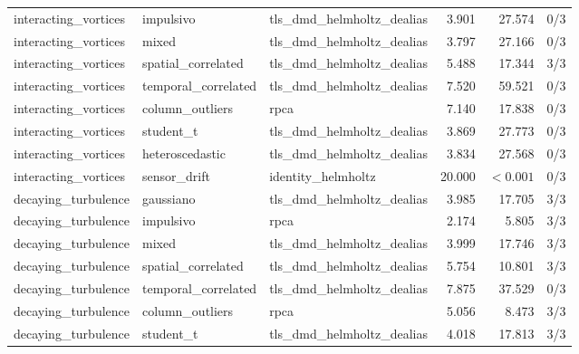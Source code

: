 {\begin{longtable}{p{}p{}p{}rrr}
interacting\_\allowbreak vortices & impulsivo & tls\_\allowbreak dmd\_\allowbreak helmholtz\_\allowbreak dealias & 3.901 & 27.574 & 0/3 \\
interacting\_\allowbreak vortices & mixed & tls\_\allowbreak dmd\_\allowbreak helmholtz\_\allowbreak dealias & 3.797 & 27.166 & 0/3 \\
interacting\_\allowbreak vortices & spatial\_\allowbreak correlated & tls\_\allowbreak dmd\_\allowbreak helmholtz\_\allowbreak dealias & 5.488 & 17.344 & 3/3 \\
interacting\_\allowbreak vortices & temporal\_\allowbreak correlated & tls\_\allowbreak dmd\_\allowbreak helmholtz\_\allowbreak dealias & 7.520 & 59.521 & 0/3 \\
interacting\_\allowbreak vortices & column\_\allowbreak outliers & rpca & 7.140 & 17.838 & 0/3 \\
interacting\_\allowbreak vortices & student\_\allowbreak t & tls\_\allowbreak dmd\_\allowbreak helmholtz\_\allowbreak dealias & 3.869 & 27.773 & 0/3 \\
interacting\_\allowbreak vortices & heteroscedastic & tls\_\allowbreak dmd\_\allowbreak helmholtz\_\allowbreak dealias & 3.834 & 27.568 & 0/3 \\
interacting\_\allowbreak vortices & sensor\_\allowbreak drift & identity\_\allowbreak helmholtz & 20.000 & $<0.001$ & 0/3 \\
decaying\_\allowbreak turbulence & gaussiano & tls\_\allowbreak dmd\_\allowbreak helmholtz\_\allowbreak dealias & 3.985 & 17.705 & 3/3 \\
decaying\_\allowbreak turbulence & impulsivo & rpca & 2.174 & 5.805 & 3/3 \\
decaying\_\allowbreak turbulence & mixed & tls\_\allowbreak dmd\_\allowbreak helmholtz\_\allowbreak dealias & 3.999 & 17.746 & 3/3 \\
decaying\_\allowbreak turbulence & spatial\_\allowbreak correlated & tls\_\allowbreak dmd\_\allowbreak helmholtz\_\allowbreak dealias & 5.754 & 10.801 & 3/3 \\
decaying\_\allowbreak turbulence & temporal\_\allowbreak correlated & tls\_\allowbreak dmd\_\allowbreak helmholtz\_\allowbreak dealias & 7.875 & 37.529 & 0/3 \\
decaying\_\allowbreak turbulence & column\_\allowbreak outliers & rpca & 5.056 & 8.473 & 3/3 \\
decaying\_\allowbreak turbulence & student\_\allowbreak t & tls\_\allowbreak dmd\_\allowbreak helmholtz\_\allowbreak dealias & 4.018 & 17.813 & 3/3 \\

\end{longtable}}
